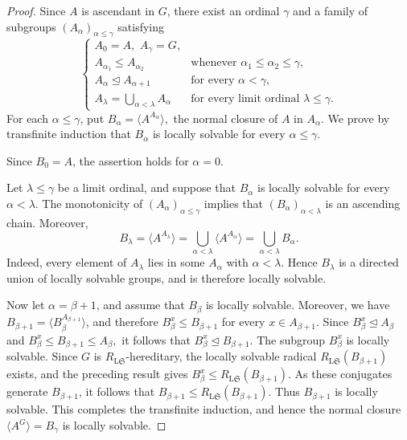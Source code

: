 \documentclass[11pt, reqno]{amsart}
\numberwithin{equation}{section}
\theoremstyle{definition}
\numberwithin{equation}{section}
\begin{document}
\begin{proof} Since $A$ is ascendant in $G$, there exist an ordinal $\gamma$ and a family of subgroups $(A_\alpha)_{\alpha\leq\gamma}$ satisfying 
$$ \left\{ 
  \begin{array}{ll} A_0=A,\,\, A_\gamma=G, \\[1mm] A_{\alpha_1}\leq A_{\alpha_2} & \text{whenever } \alpha_1\leq\alpha_2\leq\gamma, \\[1mm] A_\alpha\trianglelefteq A_{\alpha+1} & \text{for every } \alpha<\gamma, \\[1mm] A_\lambda=\displaystyle\bigcup_{\alpha<\lambda}A_\alpha & \text{for every limit ordinal } \lambda\leq\gamma. 
  \end{array} \right. $$ 
For each $\alpha\leq\gamma$, put $ B_\alpha=\langle A^{A_\alpha}\rangle,$ the normal closure of $A$ in $A_\alpha$. We prove by transfinite induction that $B_\alpha$ is locally solvable for every $\alpha\leq\gamma$. 

Since $B_0=A$, the assertion holds for $\alpha=0$. 

Let $\lambda\leq\gamma$ be a limit ordinal, and suppose that $B_\alpha$ is locally solvable for every $\alpha<\lambda$. The monotonicity of $(A_\alpha)_{\alpha\leq\gamma}$ implies that $(B_\alpha)_{\alpha<\lambda}$ is an ascending chain. Moreover, $$ B_\lambda = \bigl\langle A^{A_\lambda}\bigr\rangle = \bigcup_{\alpha<\lambda} \bigl\langle A^{A_\alpha} \bigr\rangle = \bigcup_{\alpha<\lambda}B_\alpha. $$ Indeed, every element of $A_\lambda$ lies in some $A_\alpha$ with $\alpha<\lambda$. Hence $B_\lambda$ is a directed union of locally solvable groups, and is therefore locally solvable. 

Now let $\alpha=\beta+1$, and assume that $B_\beta$ is locally solvable. Moreover, we have $B_{\beta+1}=\bigl\langle B_\beta^{A_{\beta+1}}\bigr\rangle$, and therefore $B_\beta^x\leq B_{\beta+1}$ for every $x\in A_{\beta+1}$. Since \(B_\beta^x\trianglelefteq A_\beta\) and $B_\beta^x\leq B_{\beta+1}\leq A_\beta,$ it follows that $B_\beta^x\trianglelefteq B_{\beta+1}.$
The subgroup $B_\beta^x$ is locally solvable. Since $G$ is $R_{\mathrm{L}\mathfrak{S}}$-hereditary, the locally solvable radical
$R_{\mathrm{L}\mathfrak{S}}(B_{\beta+1})$ exists, and the preceding result
gives
$B_\beta^x \leq R_{\mathrm{L}\mathfrak{S}}(B_{\beta+1}).$ As these conjugates generate
$B_{\beta+1}$, it follows that
$B_{\beta+1} \leq R_{\mathrm{L}\mathfrak{S}}(B_{\beta+1}).$
Thus $B_{\beta+1}$ is locally solvable. This completes the transfinite
induction, and hence the normal closure
$\langle A^G\rangle=B_\gamma$
is locally solvable. 
\end{proof}
\end{document}
